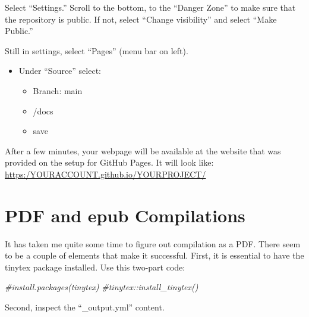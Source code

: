 \documentclass[
]{book}
\newenvironment{Shaded}{\begin{snugshade}}{\end{snugshade}}
\newcommand{\CommentTok}[1]{\textcolor[rgb]{0.56,0.35,0.01}{\textit{#1}}}
\providecommand{\tightlist}{%
  \setlength{\itemsep}{0pt}\setlength{\parskip}{0pt}}
\begin{document}
Select ``Settings.'' Scroll to the bottom, to the ``Danger Zone'' to make sure that the repository is public. If not, select ``Change visibility'' and select ``Make Public.''

Still in settings, select ``Pages'' (menu bar on left).

\begin{itemize}
\tightlist
\item
  Under ``Source'' select:

  \begin{itemize}
  \tightlist
  \item
    Branch: main
  \item
    /docs
  \item
    save
  \end{itemize}
\end{itemize}

After a few minutes, your webpage will be available at the website that was provided on the setup for GitHub Pages. It will look like: \url{https:/YOURACCOUNT.github.io/YOURPROJECT/}

\hypertarget{pdf-and-epub-compilations}{%
\section{PDF and epub Compilations}\label{pdf-and-epub-compilations}}

It has taken me quite some time to figure out compilation as a PDF. There seem to be a couple of elements that make it successful. First, it is essential to have the tinytex package installed. Use this two-part code:

\begin{Shaded}
\begin{Highlighting}[]
\CommentTok{\#install.packages(\textquotesingle{}tinytex\textquotesingle{})}
\CommentTok{\#tinytex::install\_tinytex()}
\end{Highlighting}
\end{Shaded}

Second, inspect the ``\_output.yml'' content.
\end{document}
